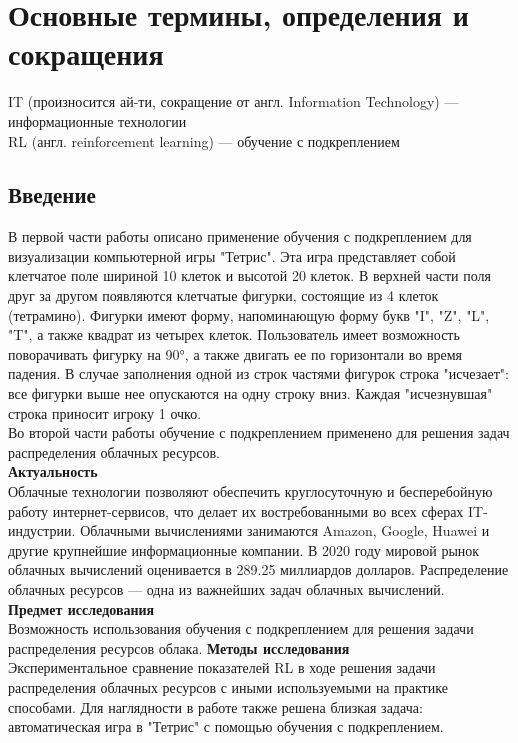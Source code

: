 \documentclass{article}
\begin{document}
\section {Основные термины, определения и сокращения}
IT (произносится ай-ти, сокращение от англ. Information Technology) — информационные технологии\\
RL (англ. reinforcement learning) — обучение с подкреплением\\
\newpage
\begin{center}
\section {Введение}
\end{center}
В первой части работы описано применение обучения с подкреплением для визуализации компьютерной игры "Тетрис"\cite{litlink1}. Эта игра представляет собой клетчатое поле шириной 10 клеток и высотой 20 клеток. В верхней части поля друг за другом появляются клетчатые фигурки, состоящие из 4 клеток (тетрамино). Фигурки имеют форму, напоминающую форму букв "I", "Z", "L", "T", а также квадрат из четырех клеток. Пользователь имеет возможность поворачивать фигурку на 90°, а также двигать ее по горизонтали во время падения. В случае заполнения одной из строк частями фигурок строка "исчезает": все фигурки выше нее опускаются на одну строку вниз. Каждая "исчезнувшая" строка приносит игроку 1 очко.\\
Во второй части работы обучение с подкреплением применено для решения задач распределения облачных ресурсов.\\
\textbf{Актуальность}\\
Облачные технологии позволяют обеспечить круглосуточную и бесперебойную работу интернет-сервисов, что делает их востребованными во всех сферах IT-индустрии. Облачными вычислениями занимаются Amazon, Google, Huawei и другие крупнейшие информационные компании\cite{litlink2}\cite{litlink3}. В 2020 году мировой рынок облачных вычислений оценивается в 289.25 миллиардов долларов\cite{litlink4}. Распределение облачных ресурсов — одна из важнейших задач облачных вычислений.\\
\textbf{Предмет исследования}\\
Возможность использования обучения с подкреплением для решения задачи распределения ресурсов облака.
\textbf{Методы исследования}\\
Экспериментальное сравнение показателей RL в ходе решения задачи распределения облачных ресурсов с иными используемыми на практике способами. Для наглядности в работе также решена близкая задача: автоматическая игра в "Тетрис" с помощью обучения с подкреплением.\\
\end{document}
